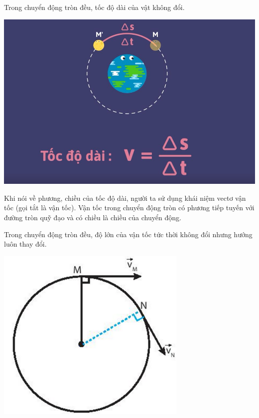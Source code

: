 Trong chuyển động tròn đều, tốc độ dài của vật không đổi. \\
\begin{center}
	\includegraphics[scale=0.3]{../figs/VN10-PH-06-L-005-2-V2-01.jpg}
\end{center}	

\begin{minipage}{0.6\textwidth}
	Khi nói về phương, chiều của tốc độ dài, người ta sử dụng khái niệm vectơ vận tốc (gọi tắt là vận tốc). Vận tốc trong chuyển động tròn có phương tiếp tuyến với đường tròn quỹ đạo và có chiều là chiều của chuyển động.
	
	Trong chuyển động tròn đều, độ lớn của vận tốc tức thời không đổi nhưng hướng luôn thay đổi.
\end{minipage}
\begin{minipage}{0.4\textwidth}
	\begin{center}
		\includegraphics[scale=0.6]{../figs/G10-026-2}
	\end{center}
\end{minipage}


